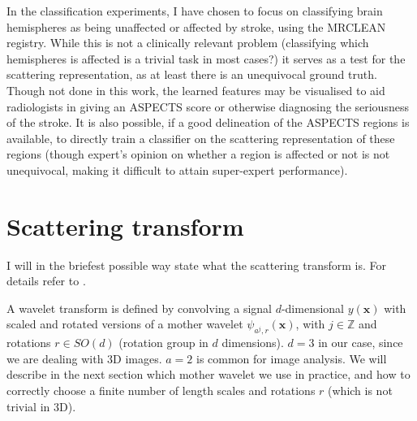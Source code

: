 \documentclass[twocolumn, openany, oneside, article]{memoir}
\begin{document}
In the classification experiments, I have chosen to focus on classifying brain hemispheres as being unaffected or
affected by stroke, using the MRCLEAN registry. While this is not a clinically relevant problem (classifying which
hemispheres is affected is a trivial task in most cases?) it serves as a test for the scattering representation, as at
least there is an unequivocal ground truth. Though not done in this work, the learned features may be visualised to aid
radiologists in giving an ASPECTS score or otherwise diagnosing the seriousness of the stroke. It is also possible, if a
good delineation of the ASPECTS regions is available, to directly train a classifier on the scattering representation of
these regions (though expert's opinion on whether a region is affected or not is not unequivocal, making it difficult to
attain super-expert performance).


\chapter{Scattering transform}
I will in the briefest possible way state what the scattering transform is. For details
refer to \cite{anden2014deep, bruna2013invariant}.

A wavelet transform is defined by convolving a signal $d$-dimensional $y(\bm{x})$ with scaled and rotated versions of a
mother wavelet $\psi_{a^j, r}(\bm{x})$, with $j \in \mathbb{Z}$ and rotations $r \in SO(d)$ (rotation group in $d$
dimensions). $d = 3$ in our case, since we are dealing with 3D images. $a = 2$ is common for image analysis. We will
describe in the next section which mother wavelet we use in practice, and how to correctly choose a finite number of
length scales and rotations $r$ (which is not trivial in 3D).
\end{document}
